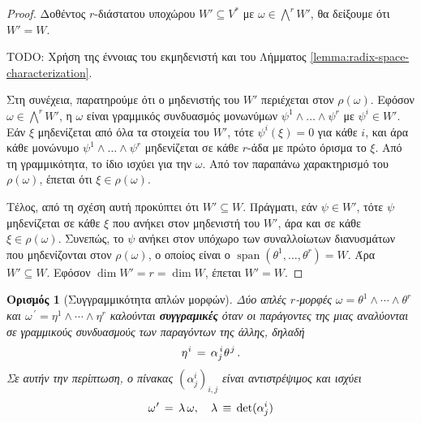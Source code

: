 \documentclass[11pt,a4paper,twoside,openright]{book}
\newtheorem{definition}[lemma]{Ορισμός}
\begin{document}
\begin{proof}
Δοθέντος $r$-διάστατου υποχώρου $W' \subseteq V^*$ με $\omega \in \bigwedge^r W'$, θα δείξουμε ότι $W' = W$.

TODO: Χρήση της έννοιας του εκμηδενιστή και του Λήμματος \ref{lemma:radix-space-characterization}.

Στη συνέχεια, παρατηρούμε ότι ο μηδενιστής του $W'$ περιέχεται στον $\rho(\omega)$. Εφόσον $\omega \in \bigwedge^r W'$, η $\omega$ είναι γραμμικός συνδυασμός μονωνύμων $\psi^1 \wedge \dots \wedge \psi^r$ με $\psi^i \in W'$. Εάν $\xi$ μηδενίζεται από όλα τα στοιχεία του $W'$, τότε $\psi^i(\xi) = 0$ για κάθε $i$, και άρα κάθε μονώνυμο $\psi^1 \wedge \dots \wedge \psi^r$ μηδενίζεται σε κάθε $r$-άδα με πρώτο όρισμα το $\xi$. Από τη γραμμικότητα, το ίδιο ισχύει για την $\omega$. Από τον παραπάνω χαρακτηρισμό του $\rho(\omega)$, έπεται ότι $\xi \in \rho(\omega)$.

Τέλος, από τη σχέση αυτή προκύπτει ότι $W' \subseteq W$. Πράγματι, εάν $\psi \in W'$, τότε $\psi$ μηδενίζεται σε κάθε $\xi$ που ανήκει στον μηδενιστή του $W'$, άρα και σε κάθε $\xi \in \rho(\omega)$. Συνεπώς, το $\psi$ ανήκει στον υπόχωρο των συναλλοίωτων διανυσμάτων που μηδενίζονται στον $\rho(\omega)$, ο οποίος είναι ο $\operatorname{span}(\theta^1, \dots, \theta^r) = W$. Άρα $W' \subseteq W$. Εφόσον $\dim W' = r = \dim W$, έπεται $W' = W$.
\end{proof}
\begin{definition}[Συγγραμμικότητα απλών μορφών]
	\label{def:collinearity-simple-forms}
Δύο απλές $r$-μορφές
$\omega = \theta^1 \wedge \cdots \wedge \theta^r$ και
$\omega^{\,\prime} = \eta^1 \wedge \cdots \wedge \eta^r$
καλούνται \textbf{συγγραμικές} όταν οι παράγοντες της μιας αναλύονται σε γραμμικούς συνδυασμούς των παραγόντων της άλλης, δηλαδή
\begin{equation}\label{eq:collinearity-simple-forms-1}
\eta^{\hspace{.5pt}i} \,=\, \alpha^{\,i}_j \hspace{.5pt} \theta^{\hspace{.75pt}j}\,.
\end{equation}
Σε αυτήν την περίπτωση, ο πίνακας $(\alpha^i_j)_{i,j}$ είναι αντιστρέψιμος και ισχύει
\begin{equation}\label{eq:collinearity-simple-forms-2}
\omega^{\hspace{.5pt}\prime}
\,=\,
\lambda \, \omega,
\quad
\lambda \,\equiv\, \det (\alpha^i_j)
\end{equation}
\end{definition}
\end{document}
